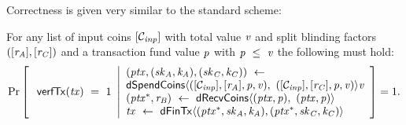 Correctness is given very similar to the standard scheme:

\begin{definition}
    \label{def:ext-tx-scheme-correctness}
    For any list of input coins $[\mathcal{C}_{\mathit{inp}}]$ with total value $\mathit{v}$ and split blinding factors
    $([\mathit{r}_{\mathit{A}}], [\mathit{r}_{\mathit{C}}])$ and a transaction fund value $\mathit{p}$ with $\mathit{p} ~\leq~ \mathit{v}$ the following must hold:
    \[
        \Pr\left[
        \begin{array}{c}
            \: \mathsf{verfTx}(\mathit{tx}) ~=~ 1
        \end{array}
        \middle\vert
        \begin{array}{l}
            (\mathit{ptx}, (\mathit{sk}_{\mathit{A}}, \mathit{\mathit{k}_{\mathit{A}}}), (\mathit{sk}_{\mathit{C}}, \mathit{\mathit{k}_{\mathit{C}}})) ~\leftarrow~ \\
            \mathsf{dSpendCoins} \langle ([\mathcal{C}_{\mathit{inp}}],[\mathit{r}_{\mathit{A}}],\mathit{p},\mathit{v}) ,~ ([\mathcal{C}_{\mathit{inp}}],[\mathit{r}_{\mathit{C}}],\mathit{p},\mathit{v}) \rangle{\mathit{v}} \\
            (\mathit{ptx}^*, \mathit{r}_{\mathit{B}}) ~\leftarrow~ \mathsf{dRecvCoins} \langle(\mathit{ptx},\mathit{p}) ,~ (\mathit{ptx},\mathit{p}) \rangle \\
            \mathit{tx} ~\leftarrow~ \mathsf{dFinTx} \langle(\mathit{ptx}^*,\mathit{sk}_{\mathit{A}},\mathit{\mathit{k}_{\mathit{A}}}),(\mathit{ptx}^*,\mathit{sk}_{\mathit{C}},\mathit{\mathit{k}_{\mathit{C}}})\rangle
        \end{array}
        \right]=1.
    \]
\end{definition}

